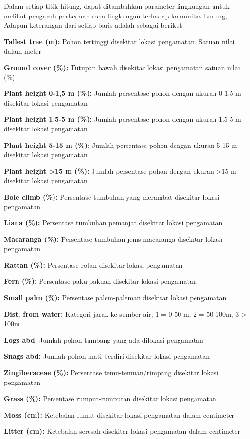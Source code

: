 \documentclass[
]{book}
\begin{document}
Dalam setiap titik hitung, dapat ditambahkan parameter lingkungan untuk melihat pengaruh perbedaan rona lingkungan terhadap komunitas burung, Adapun keterangan dari setiap baris adalah sebagai berikut

\textbf{Tallest tree (m):} Pohon tertinggi disekitar lokasi pengamatan. Satuan nilai dalam meter

\textbf{Ground cover (\%):} Tutupan bawah disekitar lokasi pengamatan satuan nilai (\%)

\textbf{Plant height 0-1,5 m (\%):} Jumlah persentase pohon dengan ukuran 0-1.5 m disekitar lokasi pengamatan

\textbf{Plant height 1,5-5 m (\%):} Jumlah persentase pohon dengan ukuran 1.5-5 m disekitar lokasi pengamatan

\textbf{Plant height 5-15 m (\%):} Jumlah persentase pohon dengan ukuran 5-15 m disekitar lokasi pengamatan

\textbf{Plant height \textgreater15 m (\%):} Jumlah persentase pohon dengan ukuran \textgreater15 m disekitar lokasi pengamatan

\textbf{Bole climb (\%):} Persentase tumbuhan yang merambat disekitar lokasi pengamatan

\textbf{Liana (\%):} Persentase tumbuhan pemanjat disekitar lokasi pengamatan

\textbf{Macaranga (\%):} Persentase tumbuhan jenis macaranga disekitar lokasi pengamatan

\textbf{Rattan (\%):} Persentase rotan disekitar lokasi pengamatan

\textbf{Fern (\%):} Persentase paku-pakuan disekitar lokasi pengamatan

\textbf{Small palm (\%):} Persentase palem-paleman disekitar lokasi pengamatan

\textbf{Dist. from water:} Kategori jarak ke sumber air; 1 = 0-50 m, 2 = 50-100m, 3 \textgreater{} 100m

\textbf{Logs abd:} Jumlah pohon tumbang yang ada dilokasi pengamatan

\textbf{Snags abd:} Jumlah pohon mati berdiri disekitar lokasi pengamatan

\textbf{Zingiberaceae (\%):} Persentase temu-temuan/rimpang disekitar lokasi pengamatan

\textbf{Grass (\%):} Persentase rumput-rumputan disekitar lokasi pengamatan

\textbf{Moss (cm):} Ketebalan lumut disekitar lokasi pengamatan dalam centimeter

\textbf{Litter (cm):} Ketebalan seresah disekitar lokasi pengamatan dalam centimeter
\end{document}
